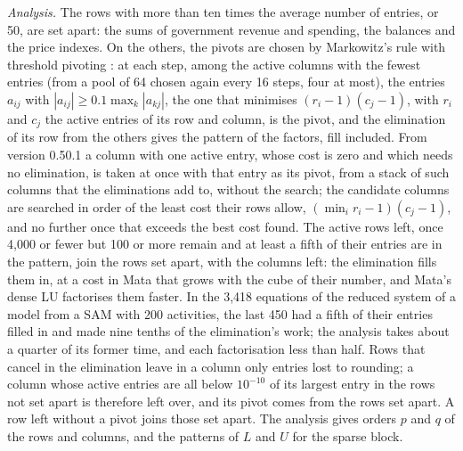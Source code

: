 \textit{Analysis.} The rows with more than ten times the average number of
entries, or 50, are set apart: the sums of government revenue and spending,
the balances and the price indexes. On the others, the pivots are chosen by
Markowitz's rule with threshold pivoting \citep{markowitz1957}: at each step,
among the active columns with the fewest entries (from a pool of 64 chosen
again every 16 steps, four at most), the entries $a_{ij}$ with
$|a_{ij}| \ge 0.1 \max_k |a_{kj}|$, the one that minimises
$(r_i - 1)(c_j - 1)$, with $r_i$ and $c_j$ the active entries of its row and
column, is the pivot, and the elimination of its row from the others gives
the pattern of the factors, fill included. From version 0.50.1 a column
with one active entry, whose cost is zero and which needs no elimination, is
taken at once with that entry as its pivot, from a stack of such columns
that the eliminations add to, without the search; the candidate columns are
searched in order of the least cost their rows allow, $(\min_i r_i - 1)
(c_j - 1)$, and no further once that exceeds the best cost found. The
active rows left, once 4,000 or fewer but 100 or more remain and at least a
fifth of their entries are in the pattern, join the rows set apart, with the
columns left: the elimination fills them in, at a cost in Mata that grows
with the cube of their number, and Mata's dense LU factorises them faster.
In the 3,418 equations of the reduced system of a model from a SAM with 200
activities, the last 450 had a fifth of their entries filled in and made
nine tenths of the elimination's work; the analysis takes about a quarter of
its former time, and each factorisation less than half. Rows that cancel in the
elimination leave in a column only entries lost to rounding; a column whose
active entries are all below $10^{-10}$ of its largest entry in the rows not
set apart is therefore left over, and its pivot comes from the rows set
apart. A row left without a pivot joins those set apart. The analysis gives
orders $p$ and $q$ of the rows and columns, and the patterns of $L$ and $U$
for the sparse block.


